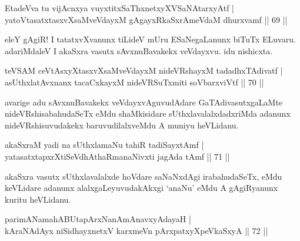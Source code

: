 \begin{shl}
EtadeVva tu vijAcnxya vuyxtitxSaThxnetxyXVSaNAtarxyAtf |\\
yatoV\s tasatxtasxvXsaMveVdayxM gAgayxRkaSxrAmeVdaM dhurxvamf \hfill || 69 ||
\end{shl}

\begin{artha}
eleY gAgiR! I tatatxvXvanunx tiLideV mUru ESaNegaLanunx biTuTx ELuvaru. adariMdaleV I akaSxra vasutx sAvxnuBavakekx veVdayxvu. idu nishicxta.
\end{artha}


\begin{shl}
teVSAM ceVtAsxyXtasxvXsaMveVdayxM nideVRshayxM tadadhxTAdivatf |\\
asUthxlatAvxnanx tacaCxkayxM nideVRSuTxmiti soV\s barxviVtf \hfill || 70 ||
\end{shl}

\begin{artha}
avarige adu sAvxnuBavakekx veVdayxvAguvudAdare GaTAdivasutxgaLaMte nideVRshisabahudaSeTx eMdu shaMkisidare sUthxlavalalxdadxriMda adanunx nideVRshisuvudakekx baruvudilalxveMdu A muniyu heVLidanu.
\end{artha}


\begin{shl}
akaSxraM yadi na sUthxlamaNu tahiR tadiSayxtAmf |\\
yatasatxtapxrXtiSeVdhAthaRmanaNivxti jagAda tAmf \hfill || 71 ||
\end{shl}

\begin{artha}
akaSxra vasutx sUthxlavalalxde hoVdare saNaNxdAgi irabahudaSeTx, eMdu keVLidare adanunx alalxgaLeyuvudakAkxgi `anaNu' eMdu A gAgiRyanunx kuritu heVLidanu.
\end{artha}


\begin{shl}
parimANamahABUtapArxNanAmAnavxyAdayaH |\\
kAraNAdAyx niSidhayxnetxV karxmeVn pArxpatxyXpeVkaSxyA \hfill || 72 ||
\end{shl}

